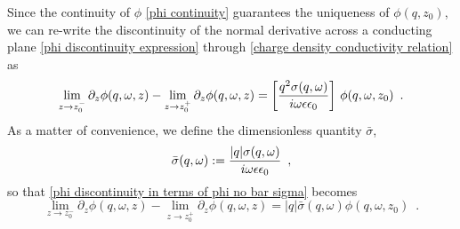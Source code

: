 \documentclass{article}
\begin{document}
Since the continuity of $\phi$ \eqref{phi continuity} guarantees the uniqueness of $\phi(q,z_0)$, we can re-write the discontinuity of the normal derivative across a conducting plane \eqref{phi discontinuity expression} through \eqref{charge density conductivity relation} as
\begin{equation}
    \label{phi discontinuity in terms of phi no bar sigma}
    \lim_{z\to z_0^-}\partial_z\phi(q,\omega,z) - \lim_{z\to z_0^+}\partial_z\phi(q,\omega,z) = \left[\frac{q^2\sigma(q,\omega)}{i\omega\epsilon\epsilon_0}\right]\,\phi(q,\omega,z_0)
    \,\,\,.
\end{equation}
As a matter of convenience, we define the dimensionless quantity $\bar\sigma$,
\begin{equation}
    \label{bar sigma def}
    \bar\sigma(q,\omega):=
    \frac{|q|\sigma(q,\omega)}{i\omega\epsilon\epsilon_0}
    \,\,\,,
\end{equation}
so that \eqref{phi discontinuity in terms of phi no bar sigma} becomes
\begin{equation}
    \label{phi discontinuity in terms of phi}
    \lim_{z\to z_0^-}\partial_z\phi(q,\omega,z) - \lim_{z\to z_0^+}\partial_z\phi(q,\omega,z) = |q|\bar\sigma(q,\omega)\phi(q,\omega,z_0)
    \,\,\,.
\end{equation}
\end{document}
